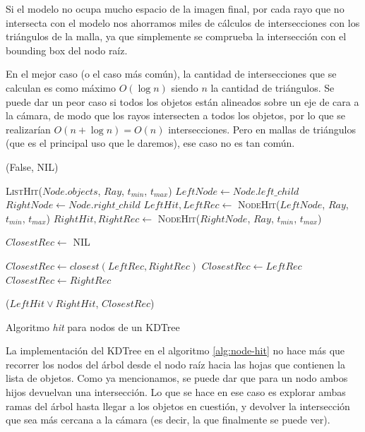 Si el modelo no ocupa mucho espacio de la imagen final, por cada rayo que no
intersecta con el modelo nos ahorramos miles de cálculos de intersecciones con
los triángulos de la malla, ya que simplemente se comprueba la intersección con
el bounding box del nodo raíz.

En el mejor caso (o el caso más común), la cantidad de intersecciones que se
calculan es como máximo $O(\log n)$ siendo $n$ la cantidad de triángulos. Se
puede dar un peor caso si todos los objetos están alineados sobre un eje de cara
a la cámara, de modo que los rayos intersecten a todos los objetos, por lo que
se realizarían $O(n+\log n)=O(n)$ intersecciones. Pero en mallas de triángulos
(que es el principal uso que le daremos), ese caso no es tan común.

\begin{algorithm}
  \begin{algorithmic}[1]
    \State \Return (False, NIL)
    \EndIf

    \State \Return \textsc{ListHit}($Node.objects$, $Ray$, $t_{min}$, $t_{max}$)
    \Else
    \State $LeftNode \gets Node.left\_child$
    \State $RightNode \gets Node.right\_child$
    \State $LeftHit, LeftRec \gets$ \textsc{NodeHit}($LeftNode$, $Ray$,
    $t_{min}$, $t_{max}$)
    \State $RightHit, RightRec \gets$ \textsc{NodeHit}($RightNode$, $Ray$,
    $t_{min}$, $t_{max}$)

    \State $ClosestRec \gets$ NIL

    \State $ClosestRec \gets closest(LeftRec, RightRec)$
    \State $ClosestRec \gets LeftRec$
    \State $ClosestRec \gets RightRec$
    \EndIf

    \State \Return ($LeftHit \lor RightHit$, $ClosestRec$)
    \EndIf
    \EndFunction
  \end{algorithmic}
  \caption{Algoritmo \textit{hit} para nodos de un KDTree}
  \label{alg:node-hit}
\end{algorithm}

La implementación del KDTree en el algoritmo \ref{alg:node-hit} no hace más que
recorrer los nodos del árbol desde el nodo raíz hacia las hojas que contienen la
lista de objetos. Como ya mencionamos, se puede dar que para un nodo ambos
hijos devuelvan una intersección. Lo que se hace en ese caso es explorar ambas
ramas del árbol hasta llegar a los objetos en cuestión, y devolver la
intersección que sea más cercana a la cámara (es decir, la que finalmente se
puede ver).


